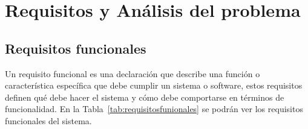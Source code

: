 \chapter{Requisitos y Análisis del problema}

\section{Requisitos funcionales}
Un requisito funcional es una declaración que describe una función o característica específica que debe cumplir un sistema o software, estos requisitos definen qué debe hacer el sistema y cómo debe comportarse en términos de funcionalidad. En la Tabla~\ref{tab:requisitosfunionales} se podrán ver los requisitos funcionales del sistema.
\begin{table}[htbp]


\end{table}
